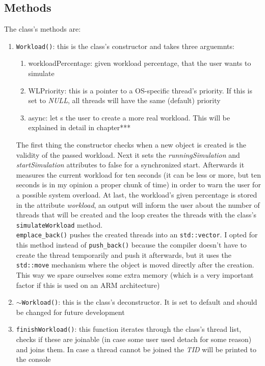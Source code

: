 \subsection{Methods}
The class's methods are:
\begin{enumerate}
	\item \texttt{Workload()}: this is the class's constructor and takes three arguemnts:
	\begin{enumerate}
		\item workloadPercentage: given workload percentage, that the user wants to simulate
		\item WLPriority: this is a pointer to a OS-specific thread's priority. If this is set to \textit{NULL}, all threads will have the same (default) priority
		\item async: let	s the user to create a more \dq real\dq{} workload. This will be explained in detail in chapter***  
	\end{enumerate}
	The first thing the constructor checks when a new object is created is the validity of the passed workload. Next it sets the \textit{runningSimulation} and \textit{startSimulation} attributes to false for a synchronized start. Afterwards it measures the current workload for ten seconds (it can be less or more, but ten seconds is in my opinion a proper chunk of time) in order to warn the user for a possible system overload.
	At last, the workload's given percentage is stored in the attribute \textit{workload}, an output will inform the user about the number of threads that will be created and the loop creates the threads with the class's \texttt{simulateWorkload} method.\\
	\texttt{emplace\_back()} pushes the created threads into an \texttt{std::vector}. I opted for this method instead of \texttt{push\_back()} because the compiler doesn't have to create the thread temporarily and push it afterwards, but it uses the \texttt{std::move} mechanism where the object is moved directly after the creation. This way we spare ourselves some extra memory (which is a very important factor if this is used on an ARM architecture)
	\item \texttt{$\sim$Workload()}: this is the class's deconstructor. It is set to default and should be changed for future development
	\item \texttt{finishWorkload()}: this function iterates through the class's thread list, checks if these are joinable (in case some user used detach for some reason) and joins them. In case a thread cannot be joined the \textit{TID} will be printed to the console

\end{enumerate}
